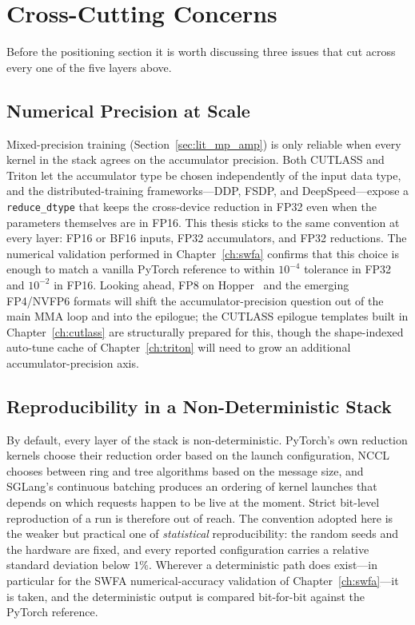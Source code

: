 \section{Cross-Cutting Concerns}\label{sec:lit_cross}

Before the positioning section it is worth discussing three issues
that cut across every one of the five layers above.

\subsection{Numerical Precision at
Scale}\label{sec:lit_precision}
Mixed-precision training (Section~\ref{sec:lit_mp_amp}) is only
reliable when every kernel in the stack agrees on the accumulator
precision. Both CUTLASS and Triton let the accumulator type be
chosen independently of the input data type, and the
distributed-training frameworks---DDP, FSDP, and DeepSpeed---expose
a \texttt{reduce\_dtype} that keeps the cross-device reduction in
FP32 even when the parameters themselves are in FP16. This thesis
sticks to the same convention at every layer: FP16 or BF16 inputs,
FP32 accumulators, and FP32 reductions. The numerical validation
performed in Chapter~\ref{ch:swfa} confirms that this choice is
enough to match a vanilla PyTorch reference to within $10^{-4}$
tolerance in FP32 and $10^{-2}$ in FP16. Looking ahead, FP8 on
Hopper~\cite{nvidia_hopper} and the emerging FP4/NVFP6 formats will
shift the accumulator-precision question out of the main MMA loop
and into the epilogue; the CUTLASS epilogue templates built in
Chapter~\ref{ch:cutlass} are structurally prepared for this, though
the shape-indexed auto-tune cache of Chapter~\ref{ch:triton} will
need to grow an additional accumulator-precision axis.

\subsection{Reproducibility in a Non-Deterministic
Stack}\label{sec:lit_repro}
By default, every layer of the stack is non-deterministic.
PyTorch's own reduction kernels choose their reduction order based
on the launch configuration, NCCL chooses between ring and tree
algorithms based on the message size, and SGLang's continuous
batching produces an ordering of kernel launches that depends on
which requests happen to be live at the moment. Strict bit-level
reproduction of a run is therefore out of reach. The convention
adopted here is the weaker but practical one of \emph{statistical}
reproducibility: the random seeds and the hardware are fixed, and
every reported configuration carries a relative standard deviation
below $1\%$. Wherever a deterministic path does exist---in
particular for the SWFA numerical-accuracy validation of
Chapter~\ref{ch:swfa}---it is taken, and the deterministic output
is compared bit-for-bit against the PyTorch reference.

